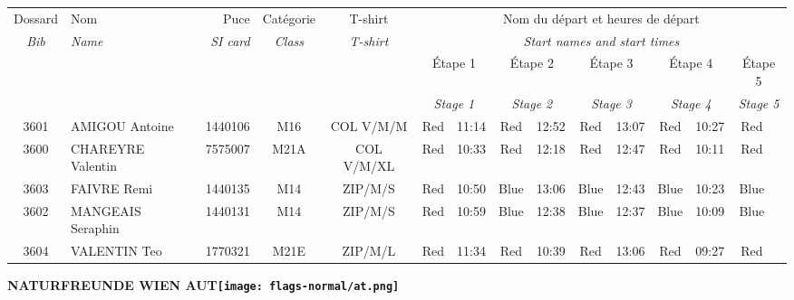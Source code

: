 \documentclass{report}
\begin{document}
  \begin{longtable}{|c|l|r|c|c|*{5}{cc|}}
    Dossard & Nom  & Puce    & Catégorie & T-shirt & \multicolumn{10}{c|}{Nom du départ et heures de départ} \\
    \itshape Bib     & \itshape Name & \itshape SI card & \itshape Class  & \itshape  T-shirt  & \multicolumn{10}{c|}{\itshape Start names and start times} \\
    \hline
    & & & & & \multicolumn{2}{c|}{Étape 1} & \multicolumn{2}{c|}{Étape 2} & \multicolumn{2}{c|}{Étape 3} & \multicolumn{2}{c|}{Étape 4} & \multicolumn{2}{c|}{Étape 5} \\
    & & & & & \multicolumn{2}{c|}{\itshape Stage 1} & \multicolumn{2}{c|}{\itshape Stage 2} & \multicolumn{2}{c|}{\itshape Stage 3} & \multicolumn{2}{c|}{\itshape Stage 4} & \multicolumn{2}{c|}{\itshape Stage 5} \\
    \hline
    3601 & AMIGOU Antoine & 1440106 & M16 & COL V/M/M & Red & 11:14 & Red & 12:52 & Red & 13:07 & Red & 10:27 & Red &  \\
    3600 & CHAREYRE Valentin & 7575007 & M21A & COL V/M/XL & Red & 10:33 & Red & 12:18 & Red & 12:47 & Red & 10:11 & Red &  \\
    3603 & FAIVRE Remi & 1440135 & M14 & ZIP/M/S & Red & 10:50 & Blue & 13:06 & Blue & 12:43 & Blue & 10:23 & Blue &  \\
    3602 & MANGEAIS Seraphin & 1440131 & M14 & ZIP/M/S & Red & 10:59 & Blue & 12:38 & Blue & 12:37 & Blue & 10:09 & Blue &  \\
    3604 & VALENTIN Teo & 1770321 & M21E & ZIP/M/L & Red & 11:34 & Red & 10:39 & Red & 13:06 & Red & 09:27 & Red &  \\
  \end{longtable}
\newpage
  \Huge \centering \bfseries NATURFREUNDE WIEN  AUT\normalfont \footnotesize \sffamily \hfill \texttt{[image: flags-normal/at.png]} \newline 
\end{document}
